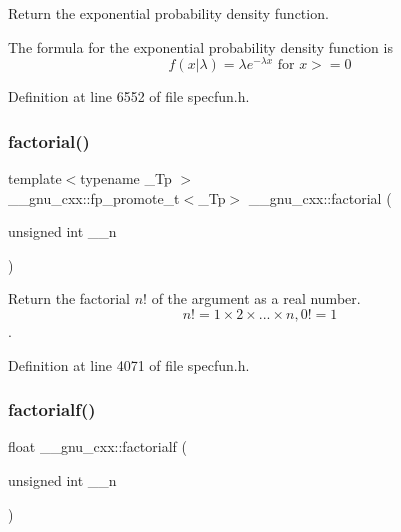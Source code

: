 Return the exponential probability density function. 

The formula for the exponential probability density function is \[ f(x|\lambda) = \lambda e^{-\lambda x} \mbox{ for } x >= 0 \] 

Definition at line 6552 of file specfun.\+h.

\mbox{\label{group__gnu__math__spec__func_ga963b1612f50b0964f5f42c9f289aab68}} 
\subsubsection{\texorpdfstring{factorial()}{factorial()}}
{\footnotesize\ttfamily template$<$typename \+\_\+\+Tp $>$ \\
\+\_\+\+\_\+gnu\+\_\+cxx\+::fp\+\_\+promote\+\_\+t$<$\+\_\+\+Tp$>$ \+\_\+\+\_\+gnu\+\_\+cxx\+::factorial (\begin{DoxyParamCaption}\item[{unsigned int}]{\+\_\+\+\_\+n }\end{DoxyParamCaption})\hspace{0.3cm}{\ttfamily [inline]}}



Return the factorial $ n! $ of the argument as a real number. \[ n! = 1 \times 2 \times ... \times n, 0! = 1 \]. 



Definition at line 4071 of file specfun.\+h.

\mbox{\label{group__gnu__math__spec__func_ga5a288283a8ed63e1d2b0145f313a5378}} 
\subsubsection{\texorpdfstring{factorialf()}{factorialf()}}
{\footnotesize\ttfamily float \+\_\+\+\_\+gnu\+\_\+cxx\+::factorialf (\begin{DoxyParamCaption}\item[{unsigned int}]{\+\_\+\+\_\+n }\end{DoxyParamCaption})\hspace{0.3cm}{\ttfamily [inline]}}

